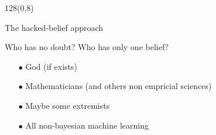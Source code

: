 \documentclass[shownotes]{beamer}
\begin{document}
\begin{frame}
 \begin{textblock}{128}(0,8)
\begin{center}
 \large The hacked-belief approach
\end{center}
\end{textblock}
\vspace{0.5cm}


\begin{center}
 
 \begin{mdframed}
 \centering
  Who has no doubt? Who has only one belief?
 \end{mdframed}
 
 \vspace{0.3cm}
 \pause
 
 \begin{itemize}
  \item[$\bullet$] God (if exists) \pause
  \item[$\bullet$] Mathematicians (and others non empricial sciences) \pause
  \item[$\bullet$] Maybe some extremists \pause
  \item[$\bullet$] \huge All non-bayesian machine learning
 \end{itemize}

 
 
 
\end{center}

 
\end{frame}
\end{document}
